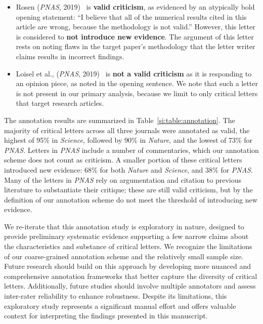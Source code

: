 \documentclass[12pt]{article} %
\begin{document}
\begin{itemize}
    \item Rosen (\textit{PNAS}, 2019)~\cite{rosen_2019_temperature} is \textbf{valid criticism}, as evidenced by an atypically bold opening statement: ``I believe that all of the numerical results cited in this article are wrong, because the methodology is not valid.''
    However, this letter is considered to \textbf{not introduce new evidence}.
    The argument of this letter rests on noting flaws in the target paper's methodology that the letter writer claims results in incorrect findings.

    \item Loisel et al., (\textit{PNAS}, 2019)~\cite{loisel_2019_soils} is \textbf{not a valid criticism} as it is responding to an opinion piece, as noted in the opening sentence. 
    We note that such a letter is not present in our primary analysis, because we limit to only critical letters that target research articles. 
\end{itemize}

The annotation results are summarized in Table~\ref*{si:table:annotation}.
The majority of critical letters across all three journals were annotated as valid, the highest of 95\% in \textit{Science}, followed by 90\% in \textit{Nature}, and the lowest of 73\% for \textit{PNAS}. 
Letters in \textit{PNAS} include a number of commentaries, which our annotation scheme does not count as criticism.
A smaller portion of these critical letters introduced new evidence: 68\% for both \textit{Nature} and \textit{Science}, and 38\% for \textit{PNAS}.
Many of the letters in \textit{PNAS} rely on argumentation and citation to previous literature to substantiate their critique; these are still valid criticism, but by the definition of our annotation scheme do not meet the threshold of introducing new evidence. 

We re-iterate that this annotation study is exploratory in nature, designed to provide preliminary systematic evidence supporting a few narrow claims about the characteristics and substance of critical letters. 
We recognize the limitations of our coarse-grained annotation scheme and the relatively small sample size.
Future research should build on this approach by developing more nuanced and comprehensive annotation frameworks that better capture the diversity of critical letters.
Additionally, future studies should involve multiple annotators and assess inter-rater reliability to enhance robustness.
Despite its limitations, this exploratory study represents a significant manual effort and offers valuable context for interpreting the findings presented in this manuscript.
\end{document}
